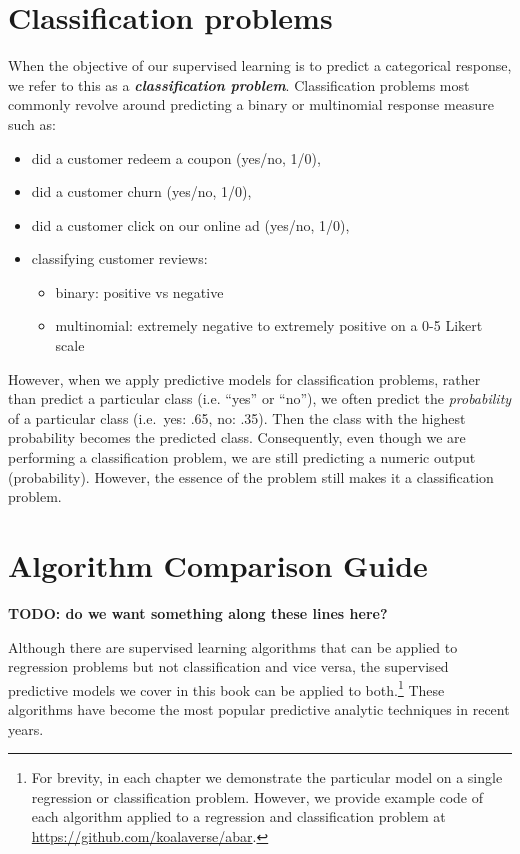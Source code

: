 \documentclass[]{book}
\providecommand{\tightlist}{%
  \setlength{\itemsep}{0pt}\setlength{\parskip}{0pt}}
\let\rmarkdownfootnote\footnote%
\def\footnote{\protect\rmarkdownfootnote}
\theoremstyle{definition}
\theoremstyle{definition}
\theoremstyle{definition}
\theoremstyle{remark}
\begin{document}
\hypertarget{classification-problems}{%
\section{Classification problems}\label{classification-problems}}

When the objective of our supervised learning is to predict a
categorical response, we refer to this as a \textbf{\emph{classification
problem}}. Classification problems most commonly revolve around
predicting a binary or multinomial response measure such as:

\begin{itemize}
\tightlist
\item
  did a customer redeem a coupon (yes/no, 1/0),
\item
  did a customer churn (yes/no, 1/0),
\item
  did a customer click on our online ad (yes/no, 1/0),
\item
  classifying customer reviews:

  \begin{itemize}
  \tightlist
  \item
    binary: positive vs negative
  \item
    multinomial: extremely negative to extremely positive on a 0-5
    Likert scale
  \end{itemize}
\end{itemize}

However, when we apply predictive models for classification problems,
rather than predict a particular class (i.e. ``yes'' or ``no''), we
often predict the \emph{probability} of a particular class (i.e.~yes:
.65, no: .35). Then the class with the highest probability becomes the
predicted class. Consequently, even though we are performing a
classification problem, we are still predicting a numeric output
(probability). However, the essence of the problem still makes it a
classification problem.

\hypertarget{algorithm-comparison-guide}{%
\section{Algorithm Comparison Guide}\label{algorithm-comparison-guide}}

\textbf{TODO: do we want something along these lines here?}

Although there are supervised learning algorithms that can be applied to
regression problems but not classification and vice versa, the
supervised predictive models we cover in this book can be applied to
both.\footnote{For brevity, in each chapter we demonstrate the
  particular model on a single regression or classification problem.
  However, we provide example code of each algorithm applied to a
  regression and classification problem at
  \url{https://github.com/koalaverse/abar}.} These algorithms have
become the most popular predictive analytic techniques in recent years.
\end{document}
